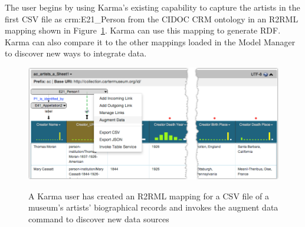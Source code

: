 The user begins by using Karma's existing capability to capture the artists in the first CSV file as crm:E21\_Person from the CIDOC CRM ontology in an R2RML mapping shown in Figure~\ref{fig:simple-model-screenshot}.  
Karma can use this mapping to generate RDF. 
Karma can also compare it to the other mappings loaded in the Model Manager to discover new ways to integrate data. 

\begin{figure}
\begin{center}
\includegraphics[width=4.8in]{images/4-simple-model.png}
\vspace{-3mm}
\caption{A Karma user has created an R2RML mapping for a CSV file of a museum's artists' biographical records and invokes the augment data command to discover new data sources}
\vspace{-2mm}
\label{fig:simple-model-screenshot}
\end{center}
\vspace{-1.5em}
\end{figure}
